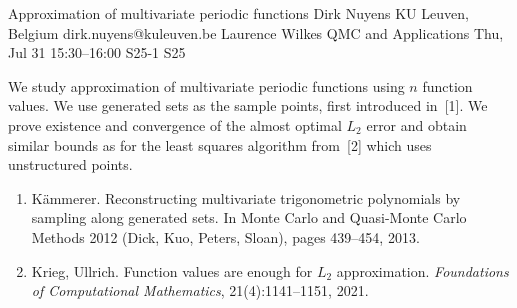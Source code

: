 \begin{talk}
\end{talk}

\begin{talk}
  {Approximation of multivariate periodic functions}%
  {Dirk Nuyens}%
  {KU Leuven, Belgium}%
  {dirk.nuyens@kuleuven.be}%
  {Laurence Wilkes}%
  {QMC and Applications}%
  {Thu, Jul 31 15:30--16:00}%
  {S25-1}%
  {S25}%
    
   
  We study approximation of multivariate periodic functions using $n$
  function values. We use generated sets as the sample points, first
  introduced in~[1]. We prove existence and convergence of the almost
  optimal $L_2$ error and obtain similar bounds as for the least squares
  algorithm from~[2] which uses unstructured points.

\medskip

\begin{enumerate}
  \item[{[1]}]
    K{\"a}mmerer.
    Reconstructing multivariate trigonometric polynomials by sampling along generated sets.
    In Monte Carlo and Quasi-Monte Carlo Methods 2012 (Dick, Kuo, Peters, Sloan), pages 439--454, 2013.
  \item[{[2]}]
    Krieg, Ullrich.
    Function values are enough for $L_2$ approximation.
    \emph{Foundations of Computational Mathematics}, 21(4):1141--1151, 2021.
\end{enumerate}

\end{talk}

